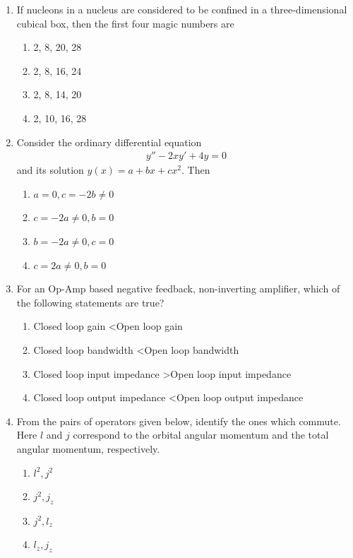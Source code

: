 \documentclass[journal,12pt,onecolumn]{IEEEtran}
\theoremstyle{remark}
\begin{document}
\begin{enumerate}
\item
If nucleons in a nucleus are considered to be confined in a three-dimensional cubical box, then the first four magic numbers are
\begin{enumerate}
    \item 2, 8, 20, 28
    \item 2, 8, 16, 24
    \item 2, 8, 14, 20
    \item 2, 10, 16, 28
\end{enumerate}


\item
Consider the ordinary differential equation \begin{align*}y'' - 2xy' + 4y = 0\end{align*} and its solution $y(x) = a + bx + cx^2$. Then
\begin{enumerate}
    \item $a = 0, c = -2b \neq 0$
    \item $c = -2a \neq 0, b = 0$
    \item $b = -2a \neq 0, c = 0$
    \item $c = 2a \neq 0, b = 0$
\end{enumerate}


\item
For an Op-Amp based negative feedback, non-inverting amplifier, which of the following statements are true?
\begin{enumerate}
    \item Closed loop gain \textless Open loop gain
    \item Closed loop bandwidth \textless Open loop bandwidth
    \item Closed loop input impedance \textgreater Open loop input impedance
    \item Closed loop output impedance \textless Open loop output impedance
\end{enumerate}


\item
From the pairs of operators given below, identify the ones which commute. Here $l$ and $j$ correspond to the orbital angular momentum and the total angular momentum, respectively.
\begin{enumerate}
    \item $l^2, j^2$
    \item $j^2, j_z$
    \item $j^2, l_z$
    \item $l_z, j_z$
\end{enumerate}



\end{enumerate}
\end{document}
